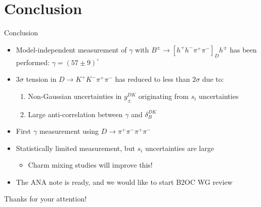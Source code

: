 \documentclass[xcolor={dvipsnames}]{beamer}
\begin{document}
\section{Conclusion}
\begin{frame}{Conclusion}
  \begin{itemize}
    \setlength\itemsep{1.0em}
    \item{Model-independent measurement of $\gamma$ with $B^\pm\to[h^+h^-\pi^+\pi^-]_Dh^\pm$ has been performed: $\gamma = (57 \pm 9)^\circ$}
    \item{$3\sigma$ tension in $D\to K^+K^-\pi^+\pi^-$ has reduced to less than $2\sigma$ due to:}
    \begin{enumerate}
      \item{Non-Gaussian uncertainties in $y_\pm^{DK}$ originating from $s_i$ uncertainties}
      \item{Large anti-correlation between $\gamma$ and $\delta_B^{DK}$}
    \end{enumerate}
    \item{First $\gamma$ measurement using $D\to\pi^+\pi^-\pi^+\pi^-$}
    \item{Statistically limited measurement, but $s_i$ uncertainties are large}
    \begin{itemize}
      \item{Charm mixing studies will improve this!}
    \end{itemize}
    \item{The ANA note is ready, and we would like to start B2OC WG review}
  \end{itemize}
  \begin{center}
    {\huge Thanks for your attention!}
  \end{center}
\end{frame}
\end{document}
